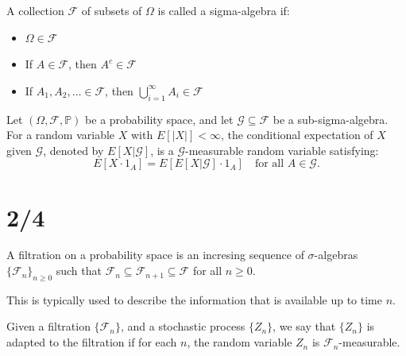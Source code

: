 \documentclass[answers,12pt,addpoints]{exam}
\begin{document}
\begin{definition}
    A collection $\mathcal{F}$ of subsets of $\Omega$ is called a sigma-algebra if:
    \begin{itemize}
        \item $\Omega \in \mathcal{F}$
        \item If $A \in \mathcal{F}$, then $A^c \in \mathcal{F}$
        \item If $A_1, A_2, \ldots \in \mathcal{F}$, then $\bigcup_{i=1}^{\infty} A_i \in \mathcal{F}$
    \end{itemize}
    
\end{definition}
\begin{definition}
    Let $(\Omega, \mathcal{F}, \mathbb{P})$ be a probability space, and let $\mathcal{G} \subseteq \mathcal{F}$ be a sub-sigma-algebra. For a random variable $X$ with $E[|X|] < \infty$, the conditional expectation of $X$ given $\mathcal{G}$, denoted by $E[X | \mathcal{G}]$, is a $\mathcal{G}$-measurable random variable satisfying:
    \[
        E[X \cdot 1_A] = E[E[X | \mathcal{G}] \cdot 1_A] \quad \text{for all } A \in \mathcal{G}.
    \]
    
\end{definition}

\section{2/4}

\begin{definition}[Filtration]
    A filtration on a probability space is an incresing sequence of $\sigma$-algebras $\{\mathcal{F}_n\}_{n \geq 0}$ such that $\mathcal{F}_n \subseteq \mathcal{F}_{n+1} \subseteq \mathcal{F}$ for all $n \geq 0$.

    This is typically used to describe the information that is available up to time $n$.
\end{definition}

\begin{definition}[Adapted r.v]
    Given a filtration $\{\mathcal{F}_n\}$, and a stochastic process $\{Z_n\}$, we say that $\{Z_n\}$ is adapted to the filtration if for each $n$, the random variable $Z_n$ is $\mathcal{F}_n$-measurable.
\end{definition}
\end{document}
